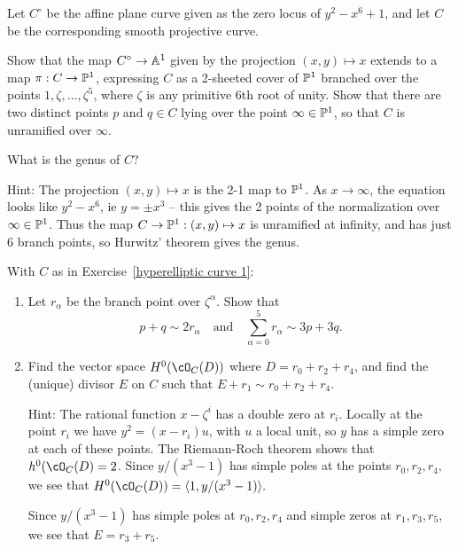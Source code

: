 \begin{exercise}\label{hyperelliptic curve 1}
Let $C^\circ$ be the affine plane curve given as the zero locus of $y^2 - x^6 +1$, and let $C$ be the corresponding smooth projective curve. 

Show  that the map $C^\circ \to \AA^1$ given by the projection $(x,y) \mapsto x$ extends to a map $\pi : C \to \PP^1$, expressing $C$ as a 2-sheeted cover of $\PP^1$ branched over the points $1, \zeta, \dots, \zeta^5$, where $\zeta$ is any primitive 6th root of unity. Show that there are two distinct points $p$ and $q \in C$  lying over the point $\infty \in \PP^1$,
so that $C$ is unramified over $\infty$.

What is the genus of $C$?

Hint: The projection $(x,y) \mapsto x$ is the 2-1 map to $\PP^1$. As $x\to \infty$, the equation looks like $y^2-x^6$, ie $y= \pm x^3$ -- this gives the 2 points of the normalization over $\infty\in \PP^1$. Thus the map $C\to \PP^1: (x,y) \mapsto x$
is unramified at infinity, and has just 6 branch points, so Hurwitz' theorem gives the genus.

\end{exercise}

\begin{exercise} With $C$ as in Exercise~\ref{hyperelliptic curve 1}:
\begin{enumerate}

\item Let $r_\alpha$ be the branch point over $\zeta^\alpha$. Show that
$$
p+q \sim 2r_\alpha \quad \text{and} \quad \sum_{\alpha = 0}^5 r_\alpha \sim 3p+3q.
$$

\item Find the vector space $H^0(\cO_C(D))$ where $D = r_0 + r_2 + r_4$, and find the (unique) divisor $E$ on $C$ such that $E + r_1 \sim r_0 + r_2 + r_4$.

Hint: The rational function $x-\zeta^i$ has a double zero at $r_i$. Locally at the point $r_i$ we have $y^2 = (x-r_i)u$,
with $u$ a local unit, so $y$ has a simple zero at each of these points. The Riemann-Roch theorem shows that $h^0(\cO_C(D) = 2$. Since $y/(x^3-1)$ has simple poles at the points $r_0,r_2,r_4,$ we see that $H^0(\cO_C(D)) = \langle1, y/(x^3-1)\rangle.$ 

Since $y/(x^3-1)$ has simple poles at $r_0,r_2,r_4$ and simple zeros at $r_1,r_3,r_5$, we see that $E = r_3+r_5$.
\end{enumerate}

\end{exercise}

